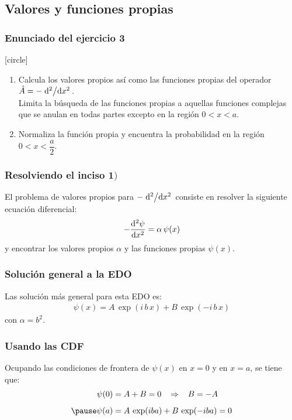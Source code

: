 \documentclass[12pt]{beamer}
\begin{document}
\subsection{Valores y funciones propias}
\begin{frame}
\frametitle{Enunciado del ejercicio 3}
[circle]
\begin{enumerate}[<+->]
\item Calcula los valores propios así como las funciones propias del operador $\hat{A} = - \dv*[2]{x}$.
\\
Limita la búsqueda de las funciones propias a aquellas funciones complejas que se anulan en todas partes excepto en la región $0 < x < a$.
\item Normaliza la función propia y encuentra la probabilidad en la región $0 < x  < \dfrac{a}{2}$.
\end{enumerate}
\end{frame}
\begin{frame}
\frametitle{Resolviendo el inciso $\mathbf{1)}$}
El problema de valores propios para $- \dv*[2]{x}$ consiste en resolver la siguiente ecuación diferencial:
\pause
\begin{align*}
- \dv[2]{\psi}{x} = \alpha \, \psi (x)
\end{align*}
\pause
y encontrar los valores propios $\alpha$ y las funciones propias $\psi(x)$.
\end{frame}
\begin{frame}
\frametitle{Solución general a la EDO}
Las solución más general para esta EDO es:
\pause
\begin{align*}
\psi(x) = A \, \exp (i \, b \, x ) + B \, \exp (-i \, b \, x )
\end{align*}
con $\alpha = b^{2}$.
\end{frame}
\begin{frame}
\frametitle{Usando las CDF}
Ocupando las condiciones de frontera de $\psi(x)$ en $x = 0$ y en $x = a$, se tiene que:
\pause
\begin{eqnarray*}
\begin{aligned}
\psi (0) &= A + B = 0 \hspace{0.3cm} \Rightarrow \hspace{0.3cm} B = - A \\[0.5em] \pause
\psi (a) &= A \, \exp (i b a) + B \, \exp(- i b a) = 0
\end{aligned}
\end{eqnarray*}
\end{frame}
\end{document}
